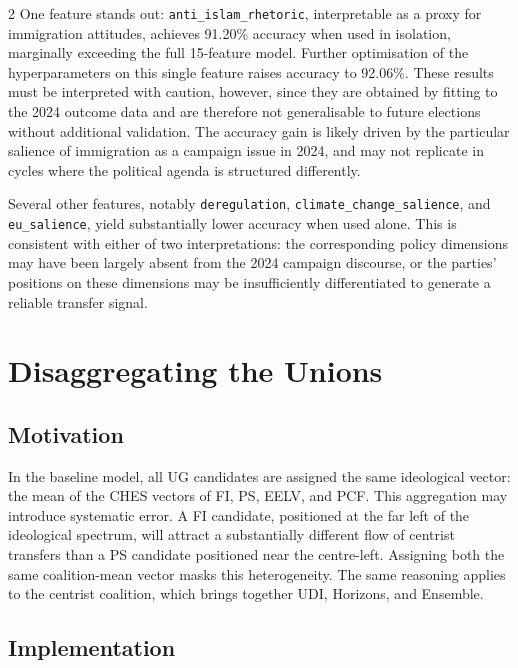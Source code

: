 \documentclass[10pt, a4paper]{article}
\begin{document}
\begin{multicols}{2}
One feature stands out: \texttt{anti\_islam\_rhetoric}, interpretable as a
proxy for immigration attitudes, achieves 91.20\% accuracy when used in
isolation, marginally exceeding the full 15-feature model. Further
optimisation of the hyperparameters on this single feature raises accuracy
to 92.06\%. These results must be interpreted with caution, however, since
they are obtained by fitting to the 2024 outcome data and are therefore not
generalisable to future elections without additional validation. The accuracy
gain is likely driven by the particular salience of immigration as a campaign
issue in 2024, and may not replicate in cycles where the political agenda is
structured differently.

Several other features, notably \texttt{deregulation},
\texttt{climate\_change\_salience}, and \texttt{eu\_salience}, yield
substantially lower accuracy when used alone. This is consistent with either
of two interpretations: the corresponding policy dimensions may have been
largely absent from the 2024 campaign discourse, or the parties' positions
on these dimensions may be insufficiently differentiated to generate a
reliable transfer signal.

\section{Disaggregating the Unions}
\label{sec:ug-split}

\subsection{Motivation}

In the baseline model, all UG candidates are assigned the same ideological
vector: the mean of the CHES vectors of FI, PS, EELV, and PCF.
This aggregation may introduce systematic error. A FI candidate, positioned
at the far left of the ideological spectrum, will attract a substantially
different flow of centrist transfers than a PS candidate positioned near the
centre-left. Assigning both the same coalition-mean vector masks this
heterogeneity. The same reasoning applies to the centrist coalition, which
brings together UDI, Horizons, and Ensemble.

\subsection{Implementation}


\end{multicols}
\end{document}
